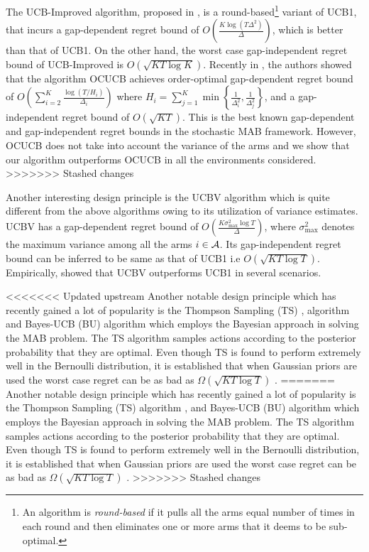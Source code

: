 	 The UCB-Improved algorithm, proposed in \citet{auer2010ucb}, is a round-based\footnote{An algorithm is \textit{round-based} if it pulls all the arms equal number of times in each round and then eliminates one or more arms that it deems  to be sub-optimal.} variant of UCB1, that 
incurs a gap-dependent regret bound of $O\left(\frac{K\log (T\Delta^{2})}{\Delta}\right)$, which is better than that of UCB1. On the other hand, the worst case gap-independent regret bound of UCB-Improved is $O\left(\sqrt{KT\log K}\right)$. Recently in \citet{lattimore2015optimally}, the authors showed that  the algorithm OCUCB achieves order-optimal gap-dependent regret bound of $O\left(\sum_{i=2}^{K}\frac{\log\left(T/H_i\right)}{\Delta_i}\right)$ where $H_i=\sum_{j=1}^{K}\min\left\lbrace \frac{1}{\Delta_i^2},\frac{1}{\Delta_j^2}\right\rbrace$, and a gap-independent regret bound of $O\left( \sqrt{KT}\right)$. This is the best known gap-dependent and gap-independent regret bounds in the stochastic MAB framework. However, OCUCB does not take into account the variance of the arms and we show that our algorithm outperforms OCUCB in all the environments considered. 
>>>>>>> Stashed changes

	Another interesting design principle is the UCBV \cite{audibert2009exploration} algorithm which is quite different  from the above algorithms owing to its utilization of variance estimates. UCBV has a gap-dependent regret bound of $O\left(\frac{K\sigma_{\max}^{2}\log T}{\Delta}\right)$, where $\sigma_{\max}^{2}$ denotes the maximum variance among all the arms $i\in \mathcal{A}$. Its gap-independent regret bound can be inferred to be same as that of UCB1 i.e $O \left(\sqrt{KT\log T}\right)$. Empirically, \cite{audibert2009exploration} showed that UCBV outperforms UCB1 in several scenarios. 
	
<<<<<<< Updated upstream
	Another notable design principle which has recently gained a lot of popularity is the Thompson Sampling (TS) \cite{thompson1933likelihood}, \cite{agrawal2011analysis} algorithm and Bayes-UCB (BU) algorithm \cite{kaufmann2012bayesian} which employs the Bayesian approach in solving the MAB problem. The TS algorithm samples actions according to the posterior probability that they are optimal. Even though TS is found to perform extremely well in the Bernoulli distribution, it is established that when Gaussian priors are used the worst case regret can be as bad as $\Omega \left( \sqrt{KT\log T}\right)$ \cite{lattimore2015optimally}.
=======
	Another notable design principle which has recently gained a lot of popularity is the Thompson Sampling (TS) algorithm \citep{thompson1933likelihood}, \citep{agrawal2011analysis}  and  Bayes-UCB (BU) algorithm \citep{kaufmann2012bayesian} which employs the Bayesian approach in solving the MAB problem. The TS algorithm samples actions according to the posterior probability that they are optimal. Even though TS is found to perform extremely well in the Bernoulli distribution, it is established that when Gaussian priors are used the worst case regret can be as bad as $\Omega \left( \sqrt{KT\log T}\right)$ \citep{lattimore2015optimally}.
>>>>>>> Stashed changes
	
